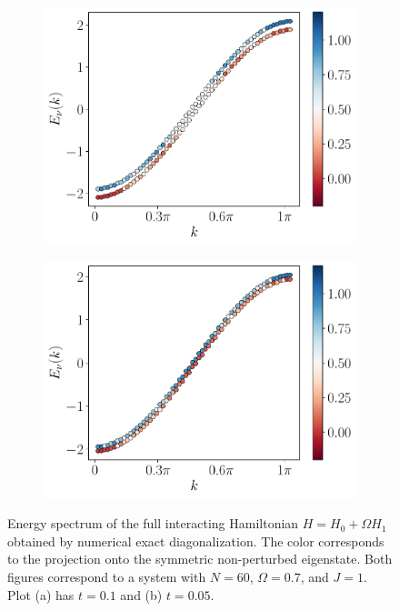 \documentclass{article}
\begin{document}
\begin{figure}[h]
    \centering
    \begin{subfigure}[b]{0.4\textwidth}
        \includegraphics[width=\textwidth]{figures/report_07_2025/exact_energies_Lqpc=60_Omega=0.7_t=0.1.pdf}
        \caption{}
    \end{subfigure}
    \hspace{0.001\textwidth}
    \begin{subfigure}[b]{0.4\textwidth}
        \includegraphics[width=\textwidth]{figures/report_07_2025/exact_energies_Lqpc=60_Omega=0.7_t=0.05.pdf}
        \caption{}
    \end{subfigure}
    \caption{Energy spectrum of the full interacting Hamiltonian $H = H_0+\Omega H_1$ obtained by numerical exact diagonalization. The color corresponds to the projection onto the symmetric non-perturbed eigenstate. Both figures correspond to a system with $N=60$, $\Omega = 0.7$, and $J=1$. Plot (a) has $t=0.1$ and (b) $t=0.05$.}
    \label{fig:exact_diagonalization}
\end{figure}
\end{document}
